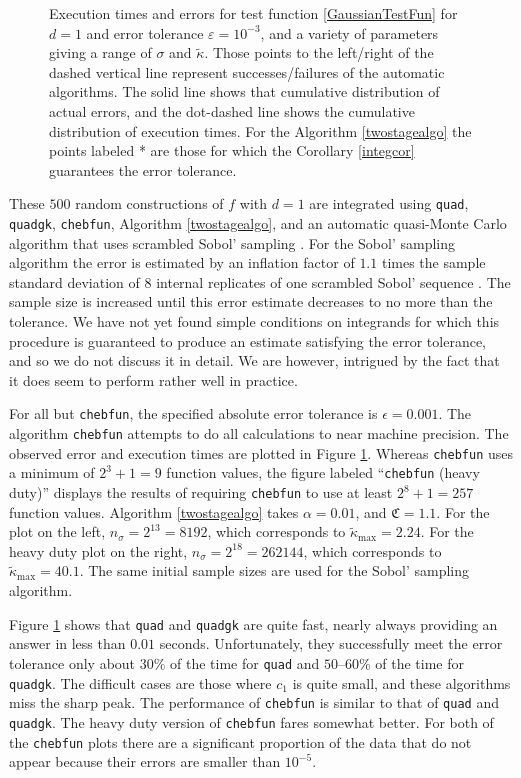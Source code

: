 \documentclass[graybox]{svmult}
\newcommand{\fudge}{\mathfrak{C}}
\newcommand{\tkappa}{\tilde{\kappa}}
\begin{document}
\begin{figure}
\caption{Execution times and errors for test function \eqref{GaussianTestFun} for $d=1$ and error tolerance $\varepsilon=10^{-3}$, and a variety of parameters giving a range of $\sigma$ and $\tkappa$. Those points to the left/right of the dashed 
vertical line 
represent successes/failures of the automatic algorithms.  The solid line shows that cumulative distribution of actual errors, and the dot-dashed line shows the cumulative distribution of execution times.  For the Algorithm \ref{twostagealgo} the points labeled * are those for which the Corollary \ref{integcor} guarantees the error tolerance.\label{GaussianTestFunFig} }
\end{figure}

These $500$ random constructions of $f$ with $d=1$ are integrated using {\tt quad},  {\tt quadgk}, {\tt chebfun}, Algorithm \ref{twostagealgo}, and an automatic quasi-Monte Carlo algorithm that uses scrambled Sobol' sampling \citep{Owe95,Owe96,Owe97,Mat98,HonHic00a,DicPil10a}.  For the Sobol' sampling algorithm the error is estimated by an inflation factor of $1.1$ times the sample standard deviation of $8$ internal replicates of one scrambled Sobol' sequence \citep{Owe06a}.  The sample size is increased until this error estimate decreases to no more than the tolerance.  We 
have not yet found simple conditions on integrands for which this procedure is guaranteed to produce an estimate satisfying the error tolerance, 
and so we do not discuss it in detail.  We are however, intrigued by the fact that it does seem to perform rather well in practice.

For all but {\tt chebfun}, the specified absolute error tolerance is $\epsilon=0.001$.  The algorithm {\tt chebfun} attempts to do all calculations to near machine precision.  The observed error and execution times are plotted in Figure \ref{GaussianTestFunFig}.  Whereas {\tt chebfun} uses a minimum of $2^3+1=9$ function values, the figure labeled ``{\tt chebfun} (heavy duty)'' displays the results of requiring {\tt chebfun} to use at least $2^{8}+1=257$ function values.  Algorithm \ref{twostagealgo} takes $\alpha=0.01$, and $\fudge=1.1$.  For the plot on the left, $n_\sigma=2^{13}=8192$, which corresponds to  $\tkappa_{\max}=2.24$.  For the heavy duty plot on the right, $n_\sigma=2^{18}=262144$, which corresponds to  $\tkappa_{\max}=40.1$.  The same initial sample sizes are used for the Sobol' sampling algorithm.

Figure \ref{GaussianTestFunFig} shows that {\tt quad} and {\tt quadgk} are quite fast, nearly always providing an answer in less than $0.01$ seconds.  Unfortunately, they 
successfully meet the error tolerance only about $30\%$ of the time for {\tt quad} and $50$--$60\%$ of the time for {\tt quadgk}.  The difficult cases are those where $c_1$ is quite small, and these algorithms miss the sharp peak.  The performance of {\tt chebfun} is similar to that of {\tt quad} and {\tt quadgk}.  The heavy duty version of  {\tt chebfun} fares somewhat better.  For both of the {\tt chebfun} plots there are a significant proportion of the data that do not appear because their 
errors are smaller than $10^{-5}$.
\end{document}

